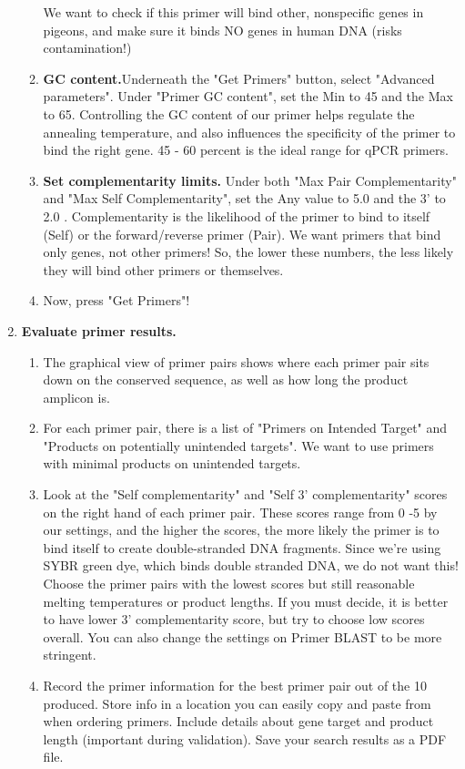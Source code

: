 \documentclass[a4paper,12pt,twoside]{book}
\begin{document}
\begin{enumerate}
\begin{enumerate}
	\subitem We want to check if this primer will bind other, nonspecific genes in pigeons, and make sure it binds NO genes in human DNA (risks contamination!)
	\item {\bf GC content.}Underneath the "Get Primers" button, select "Advanced parameters". Under "Primer GC content", set the Min to 45 and the Max to 65. 
	\subitem Controlling the GC content of our primer helps regulate the annealing temperature, and also influences the specificity of the primer to bind the right gene. 45 - 60 percent is the ideal range for qPCR primers. 
	\item{\bf Set complementarity limits.} Under both "Max Pair Complementarity" and "Max Self Complementarity", set the Any value to 5.0 and the 3' to 2.0 . 
	\subitem Complementarity is the likelihood of the primer to bind to itself (Self) or the forward/reverse primer (Pair). We want primers that bind only genes, not other primers! So, the lower these numbers, the less likely they will bind other primers or themselves.
	\item Now, press "Get Primers"! 
\end{enumerate} 
\item {\bf Evaluate primer results.}
\begin{enumerate}
	\item 	The graphical view of primer pairs shows where each primer pair sits down on the conserved sequence, as well as how long the product amplicon is. 
	\item 	For each primer pair, there is a list of "Primers on Intended Target" and "Products on potentially unintended targets".  We want to use primers with minimal products on unintended targets. 
	\item Look at the "Self complementarity" and "Self 3' complementarity" scores on the right hand of each primer pair.
	\subitem These scores range from 0 -5 by our settings, and the higher the scores, the more likely the primer is to bind itself to create double-stranded DNA fragments. Since we're using SYBR green dye, which binds double stranded DNA, we do not want this! Choose the primer pairs with the lowest scores but still reasonable melting temperatures or product lengths. If you must decide, it is better to have lower 3' complementarity score, but try to choose low scores overall. You can also change the settings on Primer BLAST to be more stringent.
	\item Record the primer information for the best primer pair out of the 10 produced. Store info in a location you can easily copy and paste from when ordering primers. Include details about gene target and product length (important during validation). Save your search results as a PDF file.  

\end{enumerate}
\end{enumerate}
\end{document}
